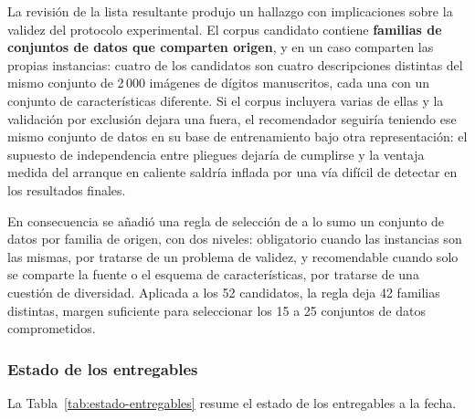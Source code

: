\documentclass[12pt,letterpaper,oneside]{article}
\begin{document}
La revisión de la lista resultante produjo un hallazgo con implicaciones sobre la validez
del protocolo experimental. El corpus candidato contiene \textbf{familias de conjuntos de
datos que comparten origen}, y en un caso comparten las propias instancias: cuatro de los
candidatos son cuatro descripciones distintas del mismo conjunto de 2\,000 imágenes de
dígitos manuscritos, cada una con un conjunto de características diferente. Si el corpus
incluyera varias de ellas y la validación por exclusión dejara una fuera, el recomendador
seguiría teniendo ese mismo conjunto de datos en su base de entrenamiento bajo otra
representación: el supuesto de independencia entre pliegues dejaría de cumplirse y la
ventaja medida del arranque en caliente saldría inflada por una vía difícil de detectar en
los resultados finales.

En consecuencia se añadió una regla de selección de a lo sumo un conjunto de datos por
familia de origen, con dos niveles: obligatorio cuando las instancias son las mismas, por
tratarse de un problema de validez, y recomendable cuando solo se comparte la fuente o el
esquema de características, por tratarse de una cuestión de diversidad. Aplicada a los 52
candidatos, la regla deja 42 familias distintas, margen suficiente para seleccionar los 15 a
25 conjuntos de datos comprometidos.

\subsubsection{Estado de los entregables}

La Tabla~\ref{tab:estado-entregables} resume el estado de los entregables a la fecha.
\end{document}

